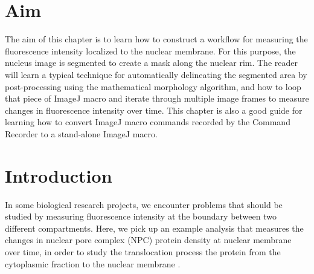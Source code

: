 \setcounter{chapter}{0}


\section{Aim}

The aim of this chapter is to learn how to construct a workflow for measuring the fluorescence intensity localized to the nuclear membrane. For this purpose, the nucleus image is segmented to create a mask along the nuclear rim. The reader will learn a typical technique for automatically delineating the segmented area by post-processing using the mathematical morphology algorithm, and how to loop that piece of ImageJ macro and iterate through multiple image frames to measure changes in fluorescence intensity over time. This chapter is also a good guide for learning how to convert ImageJ macro commands recorded by the Command Recorder to a stand-alone ImageJ macro.  

\section{Introduction}


In some biological research projects, we encounter problems that should be studied by measuring fluorescence intensity at the boundary between two different compartments. Here, we pick up an example analysis that measures the changes in nuclear pore complex (NPC) protein density at nuclear membrane over time, in order to study the translocation process the protein from the cytoplasmic fraction to the nuclear membrane \citep{Boni2015}. 

